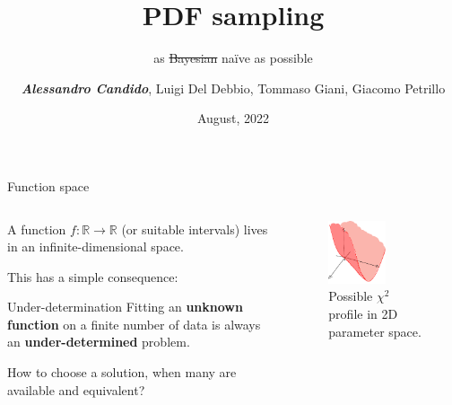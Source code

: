 \documentclass[9pt]{beamer}
\title{PDF sampling}
\subtitle{as \sout{Bayesian} na\"ive as possible}
\date{August, 2022}
\author{\textit{\textbf{Alessandro Candido}}, Luigi Del Debbio, Tommaso Giani, Giacomo Petrillo}
\begin{document}
\maketitle


\begin{frame}{Function space}
    \begin{columns}
        \begin{column}{0.5\textwidth}
            A function $f: \mathbb{R} \to \mathbb{R}$ (or suitable intervals)
            lives in an infinite-dimensional space.
            \vspace*{20pt}

            This has a simple consequence:
            \begin{block}{Under-determination}
                Fitting an \textbf{unknown function} on a finite number of data
                is always an \textbf{under-determined} problem.
            \end{block}
            \vspace*{20pt}

            How to choose a solution, when \alert{many} are available and
            \alert{equivalent}?
        \end{column}
        \begin{column}{0.5\textwidth}
            \begin{figure}
                \centering
                \includegraphics[width=0.6\textwidth]{underdetermined}
                \caption{Possible $\chi^2$ profile in 2D parameter space.}
            \end{figure}
        \end{column}
    \end{columns}
\end{frame}
\end{document}

